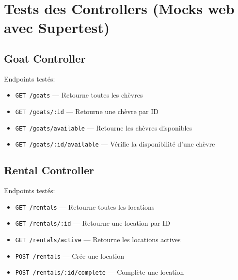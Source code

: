 \documentclass[12pt,a4paper]{report}
\begin{document}
\section{Tests des Controllers (Mocks web avec Supertest)}

\subsection{Goat Controller}

\begin{center}
\end{center}

Endpoints testés:
\begin{itemize}[leftmargin=*]
    \item \texttt{GET /goats} --- Retourne toutes les chèvres
    \item \texttt{GET /goats/:id} --- Retourne une chèvre par ID
    \item \texttt{GET /goats/available} --- Retourne les chèvres disponibles
    \item \texttt{GET /goats/:id/available} --- Vérifie la disponibilité d'une chèvre
\end{itemize}

\subsection{Rental Controller}

\begin{center}
\end{center}

Endpoints testés:
\begin{itemize}[leftmargin=*]
    \item \texttt{GET /rentals} --- Retourne toutes les locations
    \item \texttt{GET /rentals/:id} --- Retourne une location par ID
    \item \texttt{GET /rentals/active} --- Retourne les locations actives
    \item \texttt{POST /rentals} --- Crée une location
    \item \texttt{POST /rentals/:id/complete} --- Complète une location
\end{itemize}
\end{document}
